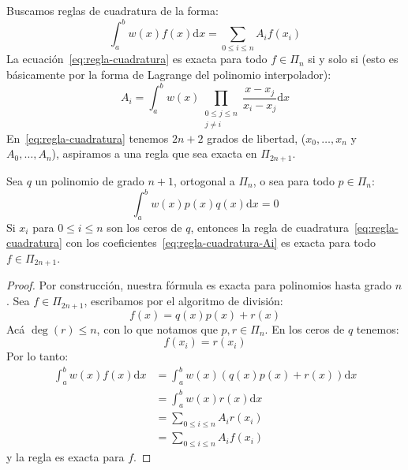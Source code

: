   Buscamos reglas de cuadratura de la forma:
  \begin{equation}
    \label{eq:regla-cuadratura}
    \int_a^b w(x) f(x) \mathrm{d} x
      = \sum_{0 \le i \le n} A_i f(x_i)
  \end{equation}
  La ecuación~\eqref{eq:regla-cuadratura} es exacta para todo \(f \in \Pi_n\)
  si y solo si
  (esto es básicamente por la forma de Lagrange del polinomio interpolador):
  \begin{equation}
    \label{eq:regla-cuadratura-Ai}
    A_i
      = \int_a^b w(x)
          \prod_{\substack{0 \le j \le n \\
                           j \ne i}} \frac{x - x_j}{x_i - x_j} \mathrm{d} x
  \end{equation}
  En~\eqref{eq:regla-cuadratura} tenemos \(2 n + 2\) grados de libertad,
  (\(x_0, \dotsc, x_n\) y \(A_0, \dotsc, A_n\)),
  aspiramos a una regla que sea exacta en \(\Pi_{2 n + 1}\).
  \begin{theorem}
    \label{theo:regla-gaussiana-exacta-2n+1}
    Sea \(q\) un polinomio de grado \(n + 1\),
    ortogonal a \(\Pi_n\),
    o sea para todo \(p \in \Pi_n\):
    \begin{equation*}
      \int_a^b w(x) p(x) q(x) \mathrm{d} x
        = 0
    \end{equation*}
    Si \(x_i\) para \(0 \le i \le n\) son los ceros de \(q\),
    entonces la regla de cuadratura~\eqref{eq:regla-cuadratura}
    con los coeficientes~\eqref{eq:regla-cuadratura-Ai}
    es exacta para todo \(f \in \Pi_{2 n + 1}\).
  \end{theorem}
  \begin{proof}
    Por construcción,
    nuestra fórmula es exacta para polinomios hasta grado \(n\).
    Sea \(f \in \Pi_{2 n + 1}\),
    escribamos por el algoritmo de división:
    \begin{equation*}
      f(x)
        = q(x) p(x) + r(x)
    \end{equation*}
    Acá \(\deg(r) \le n\),
    con lo que	notamos que \(p, r \in \Pi_n\).
    En los ceros de \(q\) tenemos:
    \begin{equation*}
      f(x_i)
        = r(x_i)
    \end{equation*}
    Por lo tanto:
    \begin{align*}
      \int_a^b w(x) f(x) \mathrm{d} x
        &= \int_a^b w(x) (q(x) p(x) + r(x)) \mathrm{d} x \\
        &= \int_a^b w(x) r(x) \mathrm{d} x \\
        &= \sum_{0 \le i \le n} A_i r(x_i) \\
        &= \sum_{0 \le i \le n} A_i f(x_i)
    \end{align*}
    y la regla es exacta para \(f\).
  \end{proof}
